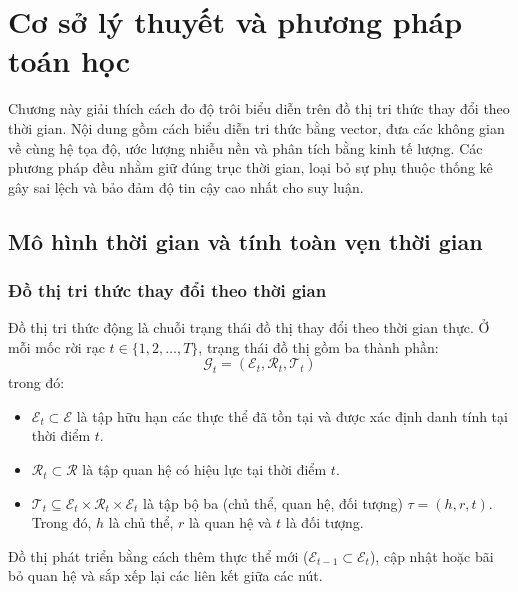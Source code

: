 \chapter{Cơ sở lý thuyết và phương pháp toán học}
\label{chap:theoretical_foundations}
\label{chap:foundations}

Chương này giải thích cách đo độ trôi biểu diễn trên đồ thị tri thức thay đổi theo thời gian. Nội dung gồm cách biểu diễn tri thức bằng vector, đưa các không gian về cùng hệ tọa độ, ước lượng nhiễu nền và phân tích bằng kinh tế lượng. Các phương pháp đều nhằm giữ đúng trục thời gian, loại bỏ sự phụ thuộc thống kê gây sai lệch và bảo đảm độ tin cậy cao nhất cho suy luận.

\section{Mô hình thời gian và tính toàn vẹn thời gian}
\label{sec:temporal_model_integrity}

\subsection{Đồ thị tri thức thay đổi theo thời gian}
Đồ thị tri thức động là chuỗi trạng thái đồ thị thay đổi theo thời gian thực. Ở mỗi mốc rời rạc $t \in \{1, 2, \dots, T\}$, trạng thái đồ thị gồm ba thành phần:
\begin{equation}
\mathcal{G}_t = \left(\mathcal{E}_t, \mathcal{R}_t, \mathcal{T}_t\right)
\end{equation}
trong đó:
\begin{itemize}
    \item $\mathcal{E}_t \subset \mathcal{E}$ là tập hữu hạn các thực thể đã tồn tại và được xác định danh tính tại thời điểm $t$.
    \item $\mathcal{R}_t \subset \mathcal{R}$ là tập quan hệ có hiệu lực tại thời điểm $t$.
    \item $\mathcal{T}_t \subseteq \mathcal{E}_t \times \mathcal{R}_t \times \mathcal{E}_t$ là tập bộ ba (chủ thể, quan hệ, đối tượng) $\tau = (h, r, t)$. Trong đó, $h$ là chủ thể, $r$ là quan hệ và $t$ là đối tượng.
\end{itemize}

Đồ thị phát triển bằng cách thêm thực thể mới ($\mathcal{E}_{t-1} \subset \mathcal{E}_t$), cập nhật hoặc bãi bỏ quan hệ và sắp xếp lại các liên kết giữa các nút.

